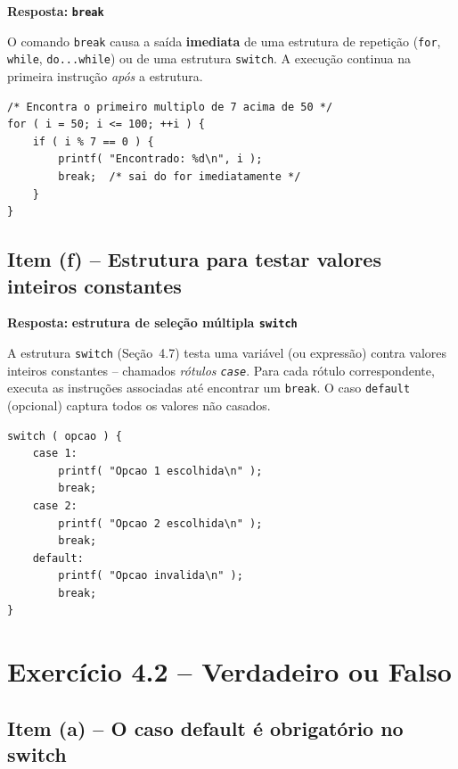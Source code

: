 \documentclass[12pt,a4paper]{article}
\begin{document}
\begin{respostabox}
\textbf{Resposta:} \textcolor{deitelblue}{\textbf{\texttt{break}}}

O comando \texttt{break} causa a saída \textbf{imediata} de uma estrutura de repetição
(\texttt{for}, \texttt{while}, \texttt{do...while}) ou de uma estrutura \texttt{switch}.
A execução continua na primeira instrução \textit{após} a estrutura.

\begin{lstlisting}
/* Encontra o primeiro multiplo de 7 acima de 50 */
for ( i = 50; i <= 100; ++i ) {
    if ( i % 7 == 0 ) {
        printf( "Encontrado: %d\n", i );
        break;  /* sai do for imediatamente */
    }
}
\end{lstlisting}
\end{respostabox}

\subsection*{Item (f) -- Estrutura para testar valores inteiros constantes}

\begin{respostabox}
\textbf{Resposta:} \textcolor{deitelblue}{\textbf{estrutura de seleção múltipla \texttt{switch}}}

A estrutura \texttt{switch} (Seção~4.7) testa uma variável (ou expressão) contra
valores inteiros constantes -- chamados \textit{rótulos \texttt{case}}. Para cada
rótulo correspondente, executa as instruções associadas até encontrar um \texttt{break}.
O caso \texttt{default} (opcional) captura todos os valores não casados.

\begin{lstlisting}
switch ( opcao ) {
    case 1:
        printf( "Opcao 1 escolhida\n" );
        break;
    case 2:
        printf( "Opcao 2 escolhida\n" );
        break;
    default:
        printf( "Opcao invalida\n" );
        break;
}
\end{lstlisting}
\end{respostabox}

\newpage

\section{Exercício 4.2 -- Verdadeiro ou Falso}

\subsection*{Item (a) -- O caso default é obrigatório no switch}
\end{document}
